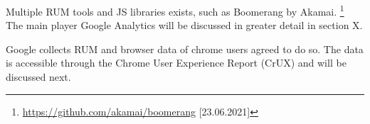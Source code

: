 
Multiple RUM tools and JS libraries exists, such as Boomerang by Akamai. \footnote{\url{https://github.com/akamai/boomerang} [23.06.2021]}
The main player Google Analytics will be discussed in greater detail in section X.




Google collects RUM and browser data of chrome users agreed to do so.
The data is accessible through the Chrome User Experience Report (CrUX) and will be discussed next.



















